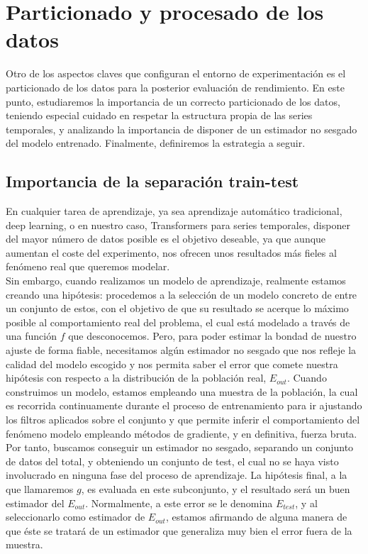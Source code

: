\section{Particionado y procesado de los datos}

Otro de los aspectos claves que configuran el entorno de experimentación es el particionado de los datos para la posterior evaluación de rendimiento. En este punto, estudiaremos la importancia de un correcto particionado de los datos, teniendo especial cuidado en respetar la estructura propia de las series temporales, y analizando la importancia de disponer de un estimador no sesgado del modelo
entrenado. Finalmente, definiremos la estrategia a seguir.

\subsection{Importancia de la separación train-test}

En cualquier tarea de aprendizaje, ya sea aprendizaje automático tradicional, deep learning, o en nuestro caso, Transformers para series temporales, disponer del mayor número de datos posible es el objetivo deseable, ya que aunque aumentan el coste del experimento, nos ofrecen unos resultados más fieles al fenómeno real que queremos modelar.\\

Sin embargo, cuando realizamos un modelo de aprendizaje, realmente estamos creando una hipótesis: procedemos a la selección de un modelo concreto de entre un conjunto de estos, con el objetivo de que su resultado se acerque lo máximo posible al comportamiento real del problema, el cual está modelado a través de una función $f$ que desconocemos. Pero, para poder estimar la bondad de nuestro ajuste de forma fiable, necesitamos algún estimador no sesgado que nos refleje la calidad del modelo escogido y nos permita saber el error que comete nuestra hipótesis con respecto a la distribución de la población real, $E_{out}$. Cuando construimos un modelo, estamos empleando una muestra de la población, la cual es recorrida continuamente durante el proceso de entrenamiento para ir ajustando los filtros aplicados sobre el conjunto y que permite inferir el comportamiento del fenómeno modelo empleando métodos de gradiente, y en definitiva, fuerza bruta.\\

Por tanto, buscamos conseguir un estimador no sesgado, separando un conjunto de datos del total, y obteniendo un conjunto de test, el cual no se haya visto involucrado en ninguna fase del proceso de aprendizaje. La hipótesis final, a la que llamaremos $g$, es evaluada en este subconjunto, y el resultado será un buen estimador del $E_{out}$. Normalmente, a este error se le denomina $E_{test}$, y al seleccionarlo como estimador de $E_{out}$, estamos afirmando de alguna manera de que éste se tratará de un estimador que generaliza muy bien el error fuera de la muestra.\\

